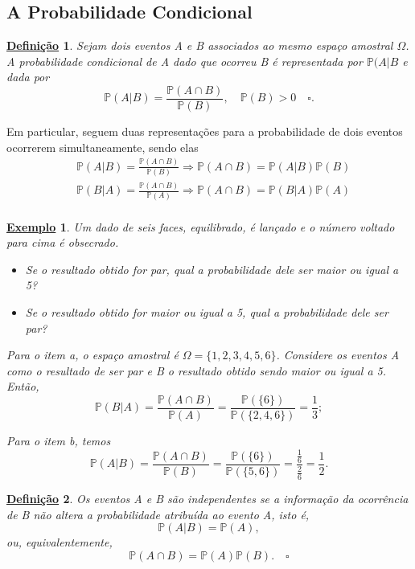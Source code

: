 \documentclass{article}
\newtheorem*{def*}{\underline{Defini\c c\~ao}}
\newtheorem{example}{\underline{Exemplo}}
\begin{document}
\subsection{A Probabilidade Condicional}
\begin{def*}
  Sejam dois eventos A e B associados ao mesmo espaço amostral \(\Omega \). A probabilidade condicional de A 
dado que ocorreu B é representada por \(\mathbb{P}(A|B\) e dada por 
  \[
    \mathbb{P}(A|B) = \frac{\mathbb{P}(A\cap B)}{\mathbb{P}(B)},\quad \mathbb{P}(B) > 0\quad \square.
  \]
\end{def*}
  Em particular, seguem duas representações para a probabilidade de dois eventos ocorrerem simultaneamente, sendo elas
  \begin{align*}
    &\mathbb{P}(A|B) = \frac{\mathbb{P}(A\cap B)}{\mathbb{P}(B)} \Rightarrow \mathbb{P}(A\cap B) = \mathbb{P}(A|B)\mathbb{P}(B)\\
    &\mathbb{P}(B|A) = \frac{\mathbb{P}(A\cap B)}{\mathbb{P}(A)} \Rightarrow \mathbb{P}(A\cap B) = \mathbb{P}(B|A)\mathbb{P}(A)\\
  \end{align*}
  \begin{example}
    Um dado de seis faces, equilibrado, é lançado e o número voltado para cima é obsecrado.
    \begin{itemize}
      \item[(a)] Se o resultado obtido for par, qual a probabilidade dele ser maior ou igual a 5?
      
    \item[(b)] Se o resultado obtido for maior ou igual a 5, qual a probabilidade dele ser par?
\end{itemize}

    Para o item a, o espaço amostral é \(\Omega = \{1, 2, 3, 4, 5, 6\}\). Considere os eventos
    A como o resultado de ser par e B o resultado obtido sendo maior ou igual a 5. Então, 
      \[
        \mathbb{P}(B|A) = \frac{\mathbb{P}(A\cap B)}{\mathbb{P}(A)} = \frac{\mathbb{P}(\{6\})}{\mathbb{P}(\{2, 4, 6\})} = \frac{1}{3};
      \]

      Para o item b, temos 
        \[
          \mathbb{P}(A|B) = \frac{\mathbb{P}(A\cap B)}{\mathbb{P}(B)} = \frac{\mathbb{P}(\{6\})}{\mathbb{P}(\{5, 6\})} = \frac{\frac{1}{6}}{\frac{2}{6}} = \frac{1}{2}.
        \]
  \end{example}
 \begin{def*}
   Os eventos A e B são independentes se a informação da ocorrência de B não altera a probabilidade atribuída ao evento A, isto é, 
     \[
       \mathbb{P}(A|B) = \mathbb{P}(A),
     \]
    ou, equivalentemente, 
    \[
      \mathbb{P}(A\cap B) = \mathbb{P}(A)\mathbb{P}(B).\quad\square
    \]
 \end{def*}
\end{document}
